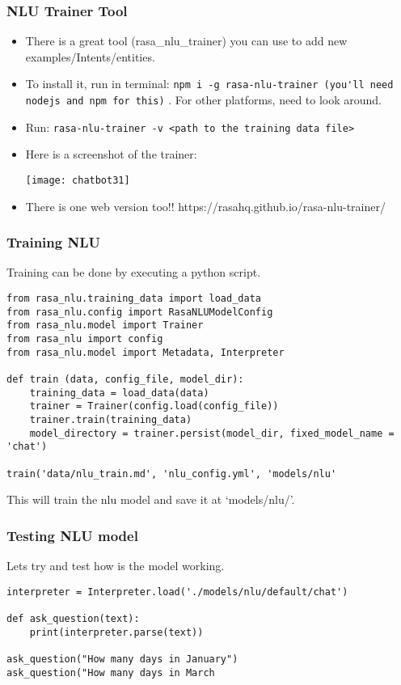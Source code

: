  \begin{frame}[fragile]\frametitle{NLU Trainer Tool}
\begin{itemize}
\item There is a great tool (rasa\_nlu\_trainer) you can use to add new examples/Intents/entities.
\item 
To install it, run in terminal: \lstinline|npm i -g rasa-nlu-trainer (you'll need nodejs and npm for this)| . For other platforms, need to look around. 
\item Run: \lstinline|rasa-nlu-trainer -v <path to the training data file>|
\item Here is a screenshot of the trainer:

\begin{center}
\texttt{[image: chatbot31]}
\end{center}

\item There is one web version too!! https://rasahq.github.io/rasa-nlu-trainer/
\end{itemize}

\end{frame}

 \begin{frame}[fragile]\frametitle{Training NLU}
 
Training can be done by executing a python script.

\begin{lstlisting}
from rasa_nlu.training_data import load_data
from rasa_nlu.config import RasaNLUModelConfig
from rasa_nlu.model import Trainer
from rasa_nlu import config
from rasa_nlu.model import Metadata, Interpreter

def train (data, config_file, model_dir):
    training_data = load_data(data)
    trainer = Trainer(config.load(config_file))
    trainer.train(training_data)
    model_directory = trainer.persist(model_dir, fixed_model_name = 'chat')

train('data/nlu_train.md', 'nlu_config.yml', 'models/nlu'
\end{lstlisting}
This will train the nlu model and save it at `models/nlu/'.
\end{frame}

 \begin{frame}[fragile]\frametitle{Testing NLU model}
 
Lets try and test how is the model working.

\begin{lstlisting}
interpreter = Interpreter.load('./models/nlu/default/chat')

def ask_question(text):
    print(interpreter.parse(text))

ask_question("How many days in January")
ask_question("How many days in March
\end{lstlisting}

\end{frame}

